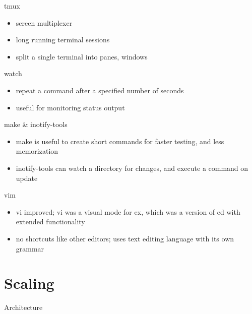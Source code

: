 \documentclass{beamer}
\begin{document}
\begin{frame}{tmux}
  \begin{itemize}
    \item screen multiplexer
    \item long running terminal sessions
    \item split a single terminal into panes, windows
  \end{itemize}
\end{frame}

\begin{frame}{watch}
  \begin{itemize}
    \item repeat a command after a specified number of seconds
    \item useful for monitoring status output
  \end{itemize}
\end{frame}

\begin{frame}{make \& inotify-tools}
  \begin{itemize}
    \item make is useful to create short commands for faster testing, and less
      memorization
    \item inotify-tools can watch a directory for changes, and execute a
      command on update
  \end{itemize}
\end{frame}

\begin{frame}{vim}
  \begin{itemize}
    \item vi improved; vi was a visual mode for ex, which was a version of ed
      with extended functionality
    \item no shortcuts like other editors; uses text editing language with its
      own grammar
  \end{itemize}
\end{frame}

\section{Scaling}

\begin{frame}{Architecture}
\end{frame}
\end{document}
